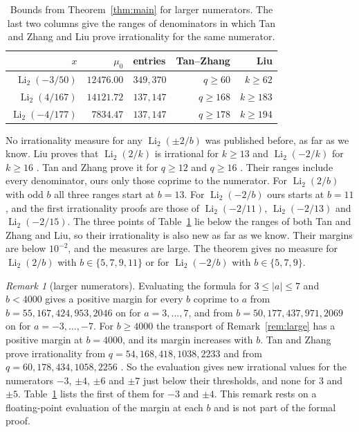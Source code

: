 \documentclass[11pt]{amsart}
\theoremstyle{definition}
\theoremstyle{remark}
\newtheorem{remark}[theorem]{Remark}
\numberwithin{equation}{section}
\newcommand{\Li}{\operatorname{Li}}
\begin{document}
\begin{table}[ht]
\centering
\renewcommand{\arraystretch}{1.1}
\setlength{\tabcolsep}{4pt}
\begin{tabular}{@{}r|rl|rr@{}}
\toprule
$x$ & $\mu_0$ & entries & Tan--Zhang & Liu\\
\midrule
$\Li_2(-3/50)$ & $12476.00$ & $349,370$ & $q\ge60$ & $k\ge62$\\
$\Li_2(4/167)$ & $14121.72$ & $137,147$ & $q\ge168$ & $k\ge183$\\
$\Li_2(-4/177)$ & $7834.47$ & $137,147$ & $q\ge178$ & $k\ge194$\\
\bottomrule
\end{tabular}
\caption{Bounds from Theorem~\ref{thm:main} for larger numerators. The last two columns give the ranges of
denominators in which Tan and Zhang \cite[Table~1]{TanZhang26} and Liu \cite{LiuLi2Rational} prove irrationality for the
same numerator.}\label{tab:larger}
\end{table}

No irrationality measure for any $\Li_2(\pm2/b)$ was published before, as far as we know. Liu proves that
$\Li_2(2/k)$ is irrational for $k\ge13$ and $\Li_2(-2/k)$ for $k\ge16$ \cite{LiuLi2Rational}. Tan and Zhang prove it for
$q\ge12$ and $q\ge16$ \cite[Table~1]{TanZhang26}. Their ranges include every denominator, ours only those coprime to
the numerator. For $\Li_2(2/b)$ with odd $b$ all three ranges start at $b=13$. For $\Li_2(-2/b)$ ours starts at $b=11$,
and the first irrationality proofs are those of $\Li_2(-2/11)$, $\Li_2(-2/13)$ and $\Li_2(-2/15)$. The three points of
Table~\ref{tab:larger} lie below the ranges of both Tan and Zhang and Liu, so their irrationality is also new as far as
we know. Their margins are below $10^{-2}$, and the measures are large. The theorem gives no measure for $\Li_2(2/b)$
with $b\in\{5,7,9,11\}$ or for $\Li_2(-2/b)$ with $b\in\{5,7,9\}$.

\begin{remark}[larger numerators]\label{rem:numerators}
Evaluating the formula for $3\le|a|\le7$ and $b<4000$ gives a positive margin for every $b$ coprime to $a$ from
$b=55,167,424,953,2046$ on for $a=3,\dots,7$, and from $b=50,177,437,971,2069$ on for $a=-3,\dots,-7$. For $b\ge4000$
the transport of Remark~\ref{rem:large} has a positive margin at $b=4000$, and its margin increases with $b$. Tan and
Zhang prove irrationality from $q=54,168,418,1038,2233$ and from $q=60,178,434,1058,2256$ \cite[Table~1]{TanZhang26}.
So the evaluation gives new irrational values for the numerators $-3$, $\pm4$, $\pm6$ and $\pm7$ just below
their thresholds, and none for $3$ and $\pm5$. Table~\ref{tab:larger} lists the first of them for $-3$ and $\pm4$. This remark rests on a floating-point evaluation of the margin at each $b$ and is not
part of the formal proof.
\end{remark}
\end{document}
